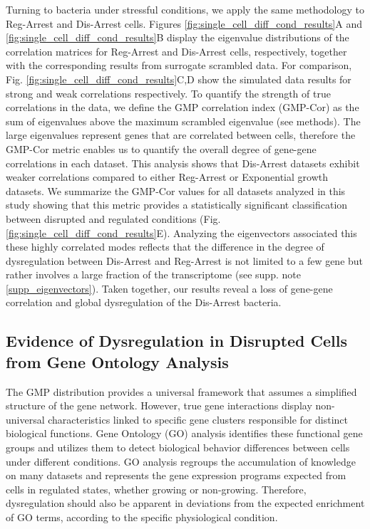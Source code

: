 \documentclass[12pt]{article}
\begin{document}
Turning to bacteria under stressful conditions, we apply the same methodology to Reg-Arrest and Dis-Arrest cells. Figures \ref{fig:single_cell_diff_cond_results}A and \ref{fig:single_cell_diff_cond_results}B display the eigenvalue distributions of the correlation matrices for Reg-Arrest and Dis-Arrest cells, respectively, together with the corresponding results from surrogate scrambled data. For comparison, Fig. \ref{fig:single_cell_diff_cond_results}C,D show the simulated data results for strong and weak correlations respectively. To quantify the strength of true correlations in the data, we define the GMP correlation index (GMP-Cor) as the sum of eigenvalues above the maximum scrambled eigenvalue (see methods). The large eigenvalues represent genes that are correlated between cells, therefore the GMP-Cor metric enables us to quantify the overall degree of gene-gene correlations in each dataset. This analysis shows that Dis-Arrest datasets exhibit weaker correlations compared to either Reg-Arrest or Exponential growth datasets. We summarize the GMP-Cor values for all datasets analyzed in this study showing that this metric provides a statistically significant classification between disrupted and regulated conditions (Fig. \ref{fig:single_cell_diff_cond_results}E). Analyzing the eigenvectors associated this these highly correlated modes reflects that the difference in the degree of dysregulation between Dis-Arrest and Reg-Arrest is not limited to a few gene but rather involves a large fraction of the transcriptome (see supp. note \ref{supp_eigenvectors}). Taken together, our results reveal a loss of gene-gene correlation and global dysregulation of the Dis-Arrest bacteria.\par 

\subsection{Evidence of Dysregulation in Disrupted Cells from Gene Ontology Analysis}
The GMP distribution provides a universal framework that assumes a simplified structure of the gene network. However, true gene interactions display non-universal characteristics linked to specific gene clusters responsible for distinct biological functions. Gene Ontology (GO) analysis identifies these functional gene groups and utilizes them to detect biological behavior differences between cells under different conditions. GO analysis regroups the accumulation of knowledge on many datasets and represents the gene expression programs expected from cells in regulated states, whether growing or non-growing. Therefore, dysregulation should also be apparent in deviations from the expected enrichment of GO terms, according to the specific physiological condition.\par
\end{document}
